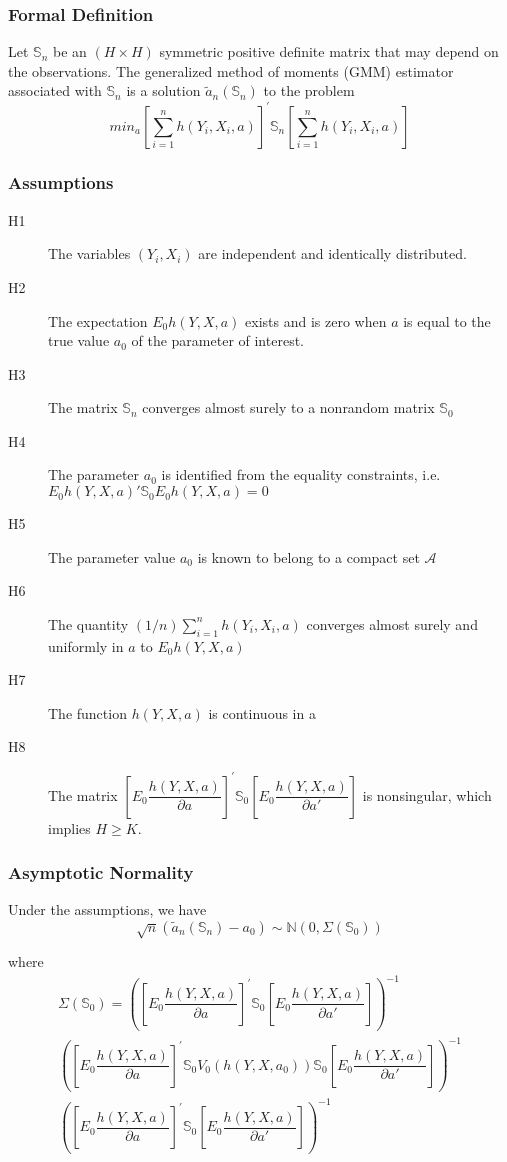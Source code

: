 \documentclass{beamer}
\newcommand{\1}{\mathbb{1}}
\newcommand{\N}{\mathbb{N}}
\begin{document}
\begin{frame}\frametitle{Formal Definition}
\begin{definition}
Let $\mathbb{S}_n$ be an $(H \times H)$ symmetric positive definite matrix that may depend on the observations. The generalized method of moments (GMM) estimator associated with $\mathbb{S}_n$ is a solution $\tilde{a}_n(\mathbb{S}_n)$ to the problem
\begin{equation*}
min_a \left[ \sum_{i=1}^{n} h(Y_i,X_i,a) \right]^{'} \mathbb{S}_n \left[ \sum_{i=1}^{n} h(Y_i,X_i,a) \right]
\end{equation*}
\end{definition}
\end{frame}

\begin{frame}\frametitle{Assumptions}
\begin{description}
\item[H1] The variables $(Y_i,X_i)$ are independent and identically distributed.
\item[H2] The expectation $E_0 h(Y,X,a)$ exists and is zero when $a$ is equal to the true value $a_0$ of the parameter of interest.
\item[H3] The matrix $\mathbb{S}_n$ converges almost surely to a nonrandom matrix $\mathbb{S}_0$
\item[H4] The parameter $a_0$ is identified from the equality constraints, i.e. $E_0 h(Y,X,a)' \mathbb{S}_0 E_0 h(Y,X,a) = 0$
\item[H5] The parameter value $a_0$ is known to belong to a compact set $\mathcal{A}$
\item[H6] The quantity $(1/n)\sum_{i=1}^n h(Y_i,X_i,a)$ converges almost surely and uniformly in $a$ to $E_0 h(Y,X,a)$
\item[H7] The function $h(Y,X,a)$ is continuous in a
\item[H8] The matrix $\left[ E_0\dfrac{h(Y,X,a)}{\partial a}  \right]^{'} \mathbb{S}_0 \left[ E_0\dfrac{h(Y,X,a)}{\partial a'} \right]$ is nonsingular, which implies $H \geq K$.
\end{description}
\end{frame}

\begin{frame}\frametitle{Asymptotic Normality}
Under the assumptions, we have
\begin{equation*}
\sqrt{n}(\tilde{a}_n(\mathbb{S}_n) - a_0) \sim \N(0,\Sigma(\mathbb{S}_0))
\end{equation*}

where 
\begin{align*}
\Sigma(\mathbb{S}_0) = \left(\left[ E_0\dfrac{h(Y,X,a)}{\partial a}  \right]^{'} \mathbb{S}_0 \left[ E_0\dfrac{h(Y,X,a)}{\partial a'} \right] \right)^{-1}\\
\left(\left[ E_0\dfrac{h(Y,X,a)}{\partial a}  \right]^{'} \mathbb{S}_0 V_0(h(Y,X,a_0)) \mathbb{S}_0 \left[ E_0\dfrac{h(Y,X,a)}{\partial a'} \right] \right)^{-1}\\
\left(\left[ E_0\dfrac{h(Y,X,a)}{\partial a}  \right]^{'} \mathbb{S}_0 \left[ E_0\dfrac{h(Y,X,a)}{\partial a'} \right] \right)^{-1}
\end{align*}

\end{frame}
\end{document}
